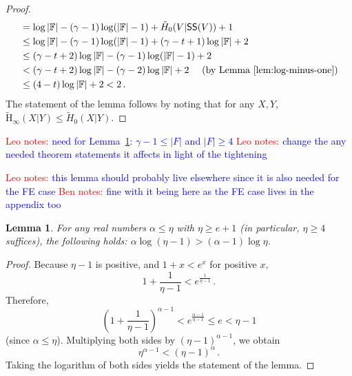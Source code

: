 \documentclass[11pt]{article}
\newcommand{\lemref}[1]{\mbox{Lemma~\ref{#1}}}
\newcommand{\class}[1]{{\ensuremath{\mathsf{#1}}}}
\newcommand{\sketch}{\ensuremath{\class{SS}}\xspace}
\newcommand{\Hav}{\tilde{\mathrm{H}}_\infty}
\newtheorem{lemma}[theorem]{Lemma}
\newcommand{\authnote}[2]{{\textcolor{red}{\textsf{#1 notes: }\textcolor{blue}{ #2}}\marginpar{\textcolor{red}{\textbf{!!!!!}}}}}
\newcommand{\authnote}[2]{}
\newcommand{\bnote}[1]{{\authnote{Ben}{#1}}}
\newcommand{\lnote}[1]{{\authnote{Leo}{#1}}}
\begin{document}
\begin{proof}
\begin{align*}
&=\log |\mathbb{F}| - (\gamma -1)\log (|\mathbb{F}|-1) + \tilde{H}_0(V | \sketch(V)) +1 \\ 
&\le \log |\mathbb{F}| - (\gamma -1)\log (|\mathbb{F}|-1) + (\gamma-t+1)\log |\mathbb{F}|+2\\
&\le (\gamma-t+2)\log |\mathbb{F}| - (\gamma-1) \log (|\mathbb{F}|-1)+2\\
&< (\gamma-t+2)\log |\mathbb{F}| - (\gamma-2) \log |\mathbb{F}| +2 \ \ \ \ \mbox{(by \lemref{lem:log-minus-one})}\\
&\le (4-t)\log |\mathbb{F}| +2< 2\,.
\end{align*}
The statement of the lemma follows by noting that for any $X, Y$, $\Hav(X|Y)\le \tilde{H}_0(X|Y)$.
\end{proof}

\lnote{need for \lemref{lem:log-minus-one}:  $\gamma-1\le |F|$ and $|F|\ge 4$}
\lnote{change the any needed theorem statements it affects in light of the tightening}

\lnote{this lemma should probably live elsewhere since it is also needed for the FE case}
\bnote{fine with it being here as the FE case lives in the appendix too}
\begin{lemma}
\label{lem:log-minus-one}
For any real numbers $\alpha \leq \eta$ with $\eta \ge e+1$ (in particular, $\eta\ge 4$ suffices), the following holds:
$\alpha \log (\eta-1) > (\alpha-1)\log \eta$. 
\end{lemma}

\begin{proof}
Because $\eta-1$ is positive, and $1+x<e^x$ for positive $x$,
$$1+\frac{1}{\eta-1} < e^{\frac{1}{\eta -1}}\,.$$  Therefore, 
$$\left(1+\frac{1}{\eta-1}\right)^{\alpha-1} < e^{\frac{\alpha-1}{\eta-1}}\le e < \eta-1$$ (since $\alpha\le \eta$). Multiplying both sides by $(\eta-1)^{\alpha-1}$, we obtain
$$\eta^{\alpha-1} < (\eta-1)^\alpha\,.$$
Taking the logarithm of both sides yields the statement of the lemma.
\end{proof}
\end{document}

